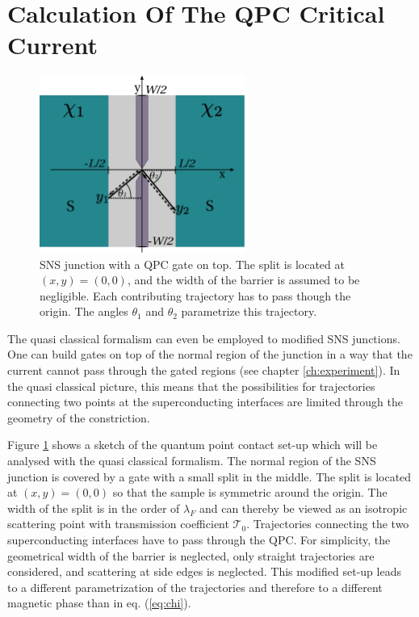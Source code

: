 \section{Calculation Of The QPC Critical Current}
\begin{figure}
\centering
\includegraphics[width=0.6\textwidth]{figure/analyticalmodel/qpc_sns_junction_csch}
\caption{SNS junction with a QPC gate on top. The split is located at $(x, y) = (0, 0)$, and the width of the barrier is assumed to be negligible. Each contributing trajectory has to pass though the origin. The angles $\theta_1$ and $\theta_2$ parametrize this trajectory.}
\label{fig:qpc_sns_schematic}
\end{figure}
The quasi classical formalism can even be employed to modified SNS junctions. One can build gates on top of the normal region of the junction in a way that the current cannot pass through the gated regions (see chapter \ref{ch:experiment}). In the quasi classical picture, this means that the possibilities for trajectories connecting two points at the superconducting interfaces are limited through the geometry of the constriction.

Figure \ref{fig:qpc_sns_schematic} shows a sketch of the quantum point contact set-up which will be analysed with the quasi classical formalism. The normal region of the SNS junction is covered by a gate with a small split in the middle. The split is located at $(x, y) = (0, 0)$ so that the sample is symmetric around the origin. The width of the split is in the order of $\lambda_F$  and can thereby be viewed as an isotropic scattering point with transmission coefficient $\mathcal{T}_0$. Trajectories connecting the two superconducting interfaces have to pass through the QPC. For simplicity, the geometrical width of the barrier is neglected, only straight trajectories are considered, and scattering at side edges is neglected. This modified set-up leads to a different parametrization of the trajectories and therefore to a different magnetic phase than in eq. (\ref{eq:chi}).

